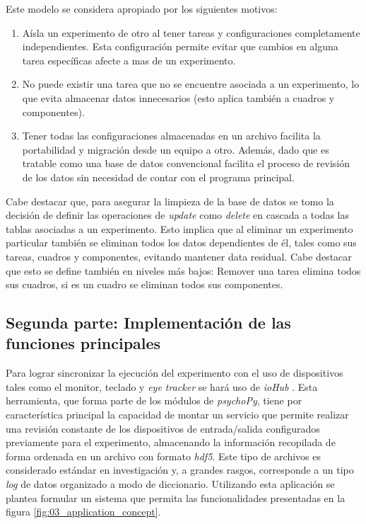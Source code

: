 \documentclass[\main/Main.tex]{subfiles}
\begin{document}
			Este modelo se considera apropiado por los siguientes motivos:
			\begin{enumerate}\setlength\itemsep{-0.5em}
				\item Aísla un experimento de otro al tener tareas y configuraciones completamente independientes. Esta configuración permite evitar que cambios en alguna tarea específicas afecte a mas de un experimento.

				\item No puede existir una tarea que no se encuentre asociada a un experimento, lo que evita almacenar datos innecesarios (esto aplica también a cuadros y componentes). 

				\item Tener todas las configuraciones almacenadas en un archivo facilita la portabilidad y migración desde un equipo a otro. Además, dado que es tratable como una base de datos convencional facilita el proceso de revisión de los datos sin necesidad de contar con el programa principal.
			\end{enumerate}

			Cabe destacar que, para asegurar la limpieza de la base de datos se tomo la decisión de definir las operaciones de \textit{update} como \textit{delete} en cascada a todas las tablas asociadas a un experimento. Esto implica que al eliminar un experimento particular también se eliminan todos los datos dependientes de él, tales como sus tareas, cuadros y componentes, evitando mantener data residual. Cabe destacar que esto se define también en niveles más bajos: Remover una tarea elimina todos sus cuadros, si es un cuadro se eliminan todos sus componentes.  

		\subsection{Segunda parte: Implementación de las funciones principales}
		\label{sub:03_implementacion_backtend}
			Para lograr sincronizar la ejecución del experimento con el uso de dispositivos tales como el monitor, teclado y \textit{eye tracker} se hará uso de \textit{ioHub} \cite{website:iohub}. Esta herramienta, que forma parte de los módulos de \textit{psychoPy}, tiene por característica principal la capacidad de montar un servicio que permite realizar una revisión constante de los dispositivos de entrada/salida configurados previamente para el experimento, almacenando la información recopilada de forma ordenada en un archivo con formato \textit{hdf5}. Este tipo de archivos es considerado estándar en investigación y, a grandes rasgos, corresponde a un tipo \textit{\gls{log}} de datos organizado a modo de diccionario. Utilizando esta aplicación se plantea formular un sistema que permita las funcionalidades presentadas en la figura \ref{fig:03_application_concept}. 
\end{document}
